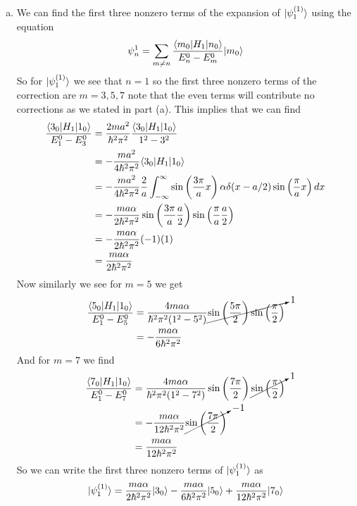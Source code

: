 \documentclass[11pt]{article}
\numberwithin{equation}{section}
\begin{document}
\begin{enumerate}[(a)]
\item
We can find the first three nonzero terms of the expansion of $|{\psi_1^{(1)}}\rangle$ using the equation 
\begin{equation}
\psi_n^1 = \sum_{m\ne n}\frac{\langle{m_0}|H_1|{n_0}\rangle}{E_n^0-E_m^0}|{m_0}\rangle
\label{FirstOrderPsi}
\end{equation}
So for $|{\psi^{(1)}_1}\rangle$ we see that $n=1$ so the first three nonzero terms of the correction are $m = 3,5,7$ note that the even terms will contribute no corrections as we stated in part (a). This implies that we can find 
\begin{align*}
\frac{\langle{3_0}|H_1|{1_0}\rangle}{E_1^0-E_3^0} &= \frac{2ma^2}{\hbar^2\pi^2}\frac{\langle{3_0}|H_1|{1_0}\rangle}{1^2-3^2}\\
&= -\frac{ma^2}{4\hbar^2\pi^2}\langle{3_0}|H_1|{1_0}\rangle\\
&= -\frac{ma^2}{4\hbar^2\pi^2}\frac{2}{a}\int_{-\infty}^{\infty}\sin\left(\frac{3\pi}{a}x\right)\alpha\delta(x-a/2)\sin\left(\frac{\pi}{a}x\right)dx\\
&= -\frac{ma\alpha}{2\hbar^2\pi^2}\sin\left(\frac{3\pi}{a}\frac{a}{2}\right)\sin\left(\frac{\pi}{a}\frac{a}{2}\right)\\
&= -\frac{ma\alpha}{2\hbar^2\pi^2}(-1)(1)\\
&= \frac{ma\alpha}{2\hbar^2\pi^2}
\end{align*}
Now similarly we see for $m=5$ we get
\begin{align*}
\frac{\langle{5_0}|H_1|{1_0}\rangle}{E_1^0-E_5^0} &= \frac{4ma\alpha}{\hbar^2\pi^2(1^2-5^2)}\cancelto{1}{\sin\left(\frac{5\pi}{2}\right)\sin\left(\frac{\pi}{2}\right)}\\
&= -\frac{ma\alpha}{6\hbar^2\pi^2}
\end{align*}
And for $m=7$ we find
\begin{align*}
\frac{\langle{7_0}|H_1|{1_0}\rangle}{E_1^0-E_7^0} &= \frac{4ma\alpha}{\hbar^2\pi^2(1^2-7^2)}\sin\left(\frac{7\pi}{2}\right)\cancelto{1}{\sin\left(\frac{\pi}{2}\right)}\\
&= -\frac{ma\alpha}{12\hbar^2\pi^2}\cancelto{-1}{\sin\left(\frac{7\pi}{2}\right)}\\
&= \frac{ma\alpha}{12\hbar^2\pi^2}
\end{align*}
So we can write the first three nonzero terms of $|{\psi_1^{(1)}}\rangle$ as
$$|{\psi_1^{(1)}}\rangle =  \frac{ma\alpha}{2\hbar^2\pi^2}|{3_0}\rangle -\frac{ma\alpha}{6\hbar^2\pi^2}|{5_0}\rangle + \frac{ma\alpha}{12\hbar^2\pi^2}|{7_0}\rangle$$
\end{enumerate}
\end{document}
